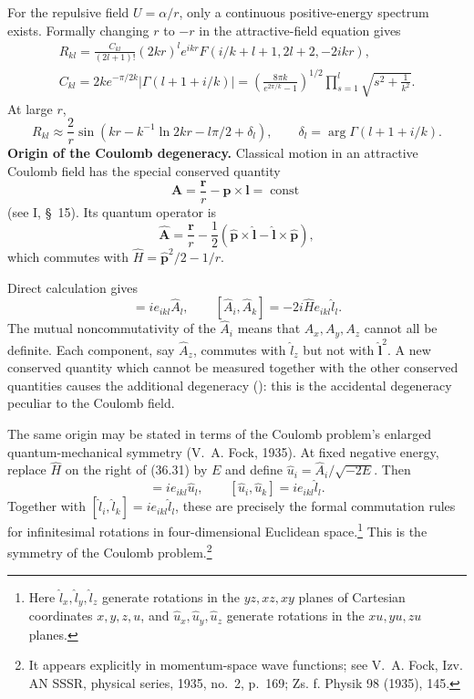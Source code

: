For the repulsive field $U=\alpha/r$, only a continuous positive-energy
spectrum exists. Formally changing $r$ to $-r$ in the attractive-field
equation gives
\begin{equation}
\begin{gathered}
 R_{kl}=\frac{C_{kl}}{(2l+1)!}(2kr)^le^{ikr}F(i/k+l+1,2l+2,-2ikr),\\
 C_{kl}=2ke^{-\pi/2k}|\Gamma(l+1+i/k)|
 =\left(\frac{8\pi k}{e^{2\pi/k}-1}\right)^{1/2}
 \prod_{s=1}^{l}\sqrt{s^2+\frac1{k^2}}.
\end{gathered}\tag{36.27}
\end{equation}
At large $r$,
\begin{equation}
 R_{kl}\approx\frac2r\sin(kr-k^{-1}\ln2kr-l\pi/2+\delta_l),\qquad
 \delta_l=\arg\Gamma(l+1+i/k).\tag{36.28}
\end{equation}
\textbf{Origin of the Coulomb degeneracy.} Classical motion in an attractive
Coulomb field has the special conserved quantity
\begin{equation}
 \mathbf A=\frac{\mathbf r}{r}-\mathbf p\times\mathbf l=\operatorname{const}
 \tag{36.29}
\end{equation}
(see I, \S~15). Its quantum operator is
\begin{equation}
 \hat{\mathbf A}=\frac{\mathbf r}{r}-\frac12
 (\hat{\mathbf p}\times\hat{\mathbf l}-\hat{\mathbf l}\times\hat{\mathbf p}),
 \tag{36.30}
\end{equation}
which commutes with $\hat H=\hat{\mathbf p}^{2}/2-1/r$.

Direct calculation gives
\begin{equation}
 [\hat l_i,\hat A_k]=i e_{ikl}\hat A_l,\qquad
 [\hat A_i,\hat A_k]=-2i\hat H e_{ikl}\hat l_l.\tag{36.31}
\end{equation}
The mutual noncommutativity of the $\hat A_i$ means that $A_x,A_y,A_z$
cannot all be definite. Each component, say $\hat A_z$, commutes with
$\hat l_z$ but not with $\hat{\mathbf l}^{2}$. A new conserved quantity
which cannot be measured together with the other conserved quantities causes
the additional degeneracy (): this is the accidental degeneracy peculiar
to the Coulomb field.

The same origin may be stated in terms of the Coulomb problem's enlarged
quantum-mechanical symmetry (V.~A. Fock, 1935). At fixed negative energy,
replace $\hat H$ on the right of (36.31) by $E$ and define
$\hat u_i=\hat A_i/\sqrt{-2E}$. Then
\begin{equation}
 [\hat l_i,\hat u_k]=i e_{ikl}\hat u_l,\qquad
 [\hat u_i,\hat u_k]=i e_{ikl}\hat l_l.\tag{36.32}
\end{equation}
Together with $[\hat l_i,\hat l_k]=i e_{ikl}\hat l_l$, these are precisely the
formal commutation rules for infinitesimal rotations in four-dimensional
Euclidean space.\footnote{Here $\hat l_x,\hat l_y,\hat l_z$ generate rotations
in the $yz,xz,xy$ planes of Cartesian coordinates $x,y,z,u$, and
$\hat u_x,\hat u_y,\hat u_z$ generate rotations in the $xu,yu,zu$ planes.}
This is the symmetry of the Coulomb problem.\footnote{It appears explicitly
in momentum-space wave functions; see V.~A. Fock, Izv. AN SSSR, physical
series, 1935, no.~2, p.~169; Zs. f. Physik 98 (1935), 145.}

